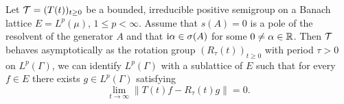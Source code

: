 \begin{theorem}\label{thm:c4-2.14}
%
%
%
Let $\mathcal{T} = (T(t))_{t \geq 0}$ be a bounded, irreducible positive semigroup on a Banach lattice $E = L^{p}(\mu)$, $1 \leq p < \infty$.
Assume that $s(A) = 0$ is a pole of the resolvent of the generator $A$ and that $\mathrm{i}\alpha \in \sigma(A)$ for some $0 \neq \alpha \in \mathbb{R}$.
Then $\mathcal{T}$ behaves asymptotically as the rotation group $(R_{\tau}(t))_{t \geq 0}$ with period $\tau > 0$ on $L^{p}(\Gamma)$, \ie  we can identify $L^{p}(\Gamma)$ with a sublattice of $E$ such that for every $f \in E$ there exists $g \in L^{p}(\Gamma)$ satisfying
\begin{equation}\label{eq:c4-2.12}
\lim_{t \to \infty} \|T(t)f - R_{\tau}(t)g\| = 0.
\end{equation}
\end{theorem}

